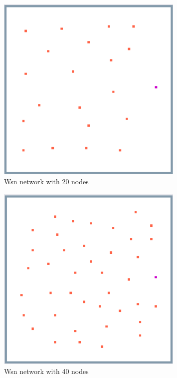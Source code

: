 \begin{figure}
  \centering
    \includegraphics[width=0.8\textwidth]{wsn_20_exp/1_wsn_20}%
    
  \caption{Wsn network with 20 nodes}
  \label{fig:wsn_20_exp/1_wsn_20}
\end{figure}

\begin{figure}
  \centering
    \includegraphics[width=0.8\textwidth]{wsn_40_exp/1_wsn_40}%
    
  \caption{Wsn network with 40 nodes}
  \label{fig:wsn_40_exp/1_wsn_40}
\end{figure}

